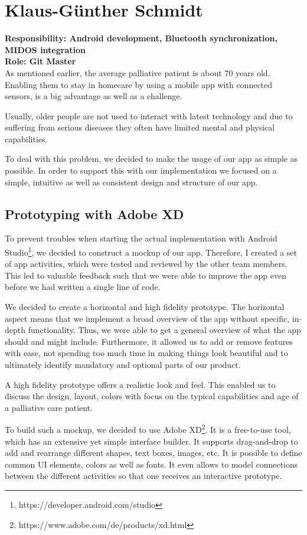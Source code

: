 \section{Klaus-Günther Schmidt}
\textbf{Responsibility: Android development, Bluetooth synchronization, MIDOS integration}\\
\textbf{Role: Git Master}\\

As mentioned earlier, the average palliative patient is about 70 years old. Enabling them to stay in homecare by using a mobile app with connected sensors, is a big advantage as well as a challenge.

Usually, older people are not used to interact with latest technology and due to suffering from serious diseases they often have limited mental and physical capabilities.

To deal with this problem, we decided to make the usage of our app as simple as possible. In order to support this with our implementation we focused on a simple, intuitive as well as consistent design and structure of our app.

\subsection{Prototyping with Adobe XD}
To prevent troubles when starting the actual implementation with Android Studio\footnote{https://developer.android.com/studio}, we decided to construct a mockup of our app. Therefore, I created a set of app activities, which were tested and reviewed by the other team members. This led to valuable feedback such that we were able to improve the app even before we had written a single line of code. 

We decided to create a horizontal and high fidelity prototype. The horizontal aspect means that we implement a broad overview of the app without specific, in-depth functionality. Thus, we were able to get a general overview of what the app should and might include. Furthermore, it allowed us to add or remove features with ease, not spending too much time in making things look beautiful and to ultimately identify mandatory and optional parts of our product.

A high fidelity prototype offers a realistic look and feel. This enabled us to discuss the design, layout, colors with focus on the typical capabilities and age of a palliative care patient.

To build such a mockup, we decided to use Adobe XD\footnote{https://www.adobe.com/de/products/xd.html}. It is a free-to-use tool, which has an extensive yet simple interface builder. It supports drag-and-drop to add and rearrange different shapes, text boxes, images, etc. It is possible to define common UI elements, colors as well as fonts. It even allows to model connections between the different activities so that one receives an interactive prototype.

